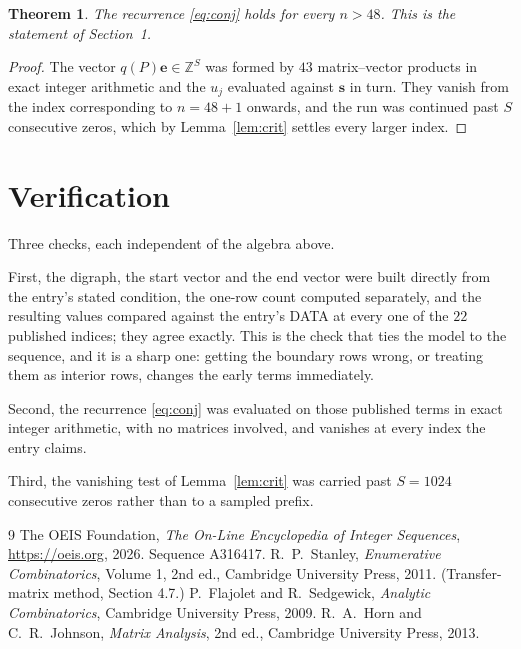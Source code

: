 \documentclass[11pt,a4paper]{article}
\theoremstyle{plain}
\newtheorem{theorem}{Theorem}
\theoremstyle{definition}
\begin{document}
\begin{theorem}
The recurrence \eqref{eq:conj} holds for every $n>48$. This is the statement of
Section~1.
\end{theorem}

\begin{proof}
The vector $q(P)\mathbf{e}\in\mathbb{Z}^{S}$ was formed by $43$ matrix--vector
products in exact integer arithmetic and the $u_j$ evaluated against $\mathbf{s}$ in turn.
They vanish from the index corresponding to $n=48+1$ onwards, and the run was continued
past $S$ consecutive zeros, which by Lemma~\ref{lem:crit} settles every larger index.
\end{proof}

\section{Verification}

Three checks, each independent of the algebra above.

First, the digraph, the start vector and the end vector were built directly from the
entry's stated condition, the one-row count computed separately, and the resulting values
compared against the entry's DATA at every one of the $22$ published indices; they
agree exactly. This is the check that ties the model to the sequence, and it is a sharp one:
getting the boundary rows wrong, or treating them as interior rows, changes the early terms
immediately.

Second, the recurrence \eqref{eq:conj} was evaluated on those published terms in exact
integer arithmetic, with no matrices involved, and vanishes at every index the entry claims.

Third, the vanishing test of Lemma~\ref{lem:crit} was carried past $S=1024$ consecutive
zeros rather than to a sampled prefix.

\begin{thebibliography}{9}
 The OEIS Foundation, \emph{The On-Line Encyclopedia of Integer
Sequences}, \url{https://oeis.org}, 2026. Sequence A316417.
 R.~P.~Stanley, \emph{Enumerative Combinatorics}, Volume 1, 2nd ed.,
Cambridge University Press, 2011. (Transfer-matrix method, Section 4.7.)
 P.~Flajolet and R.~Sedgewick, \emph{Analytic Combinatorics}, Cambridge
University Press, 2009.
 R.~A.~Horn and C.~R.~Johnson, \emph{Matrix Analysis}, 2nd ed., Cambridge
University Press, 2013.
\end{thebibliography}
\end{document}
